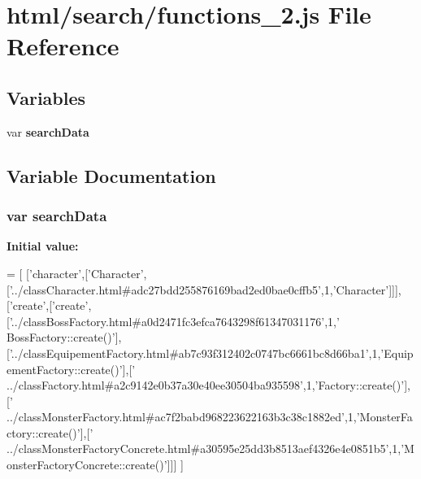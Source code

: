 \section{html/search/functions\-\_\-2.js File Reference}
\label{functions__2_8js}
\subsection*{Variables}
\begin{DoxyCompactItemize}
\item 
var {\bf search\-Data}
\end{DoxyCompactItemize}


\subsection{Variable Documentation}
\subsubsection[{search\-Data}]{\setlength{\rightskip}{0pt plus 5cm}var search\-Data}\label{functions__2_8js_ad01a7523f103d6242ef9b0451861231e}
{\bfseries Initial value\-:}
\begin{DoxyCode}
=
[
  [\textcolor{stringliteral}{'character'},[\textcolor{stringliteral}{'Character'},[\textcolor{stringliteral}{'../classCharacter.html#adc27bdd255876169bad2ed0bae0cffb5'},1,\textcolor{stringliteral}{'Character'}]]],
  [\textcolor{stringliteral}{'create'},[\textcolor{stringliteral}{'create'},[\textcolor{stringliteral}{'../classBossFactory.html#a0d2471fc3efca7643298f61347031176'},1,\textcolor{stringliteral}{'
      BossFactory::create()'}],[\textcolor{stringliteral}{'../classEquipementFactory.html#ab7c93f312402c0747bc6661bc8d66ba1'},1,\textcolor{stringliteral}{'EquipementFactory::create()'}],[\textcolor{stringliteral}{'
      ../classFactory.html#a2c9142e0b37a30e40ee30504ba935598'},1,\textcolor{stringliteral}{'Factory::create()'}],[\textcolor{stringliteral}{'
      ../classMonsterFactory.html#ac7f2babd968223622163b3c38c1882ed'},1,\textcolor{stringliteral}{'MonsterFactory::create()'}],[\textcolor{stringliteral}{'
      ../classMonsterFactoryConcrete.html#a30595e25dd3b8513aef4326e4e0851b5'},1,\textcolor{stringliteral}{'MonsterFactoryConcrete::create()'}]]]
]
\end{DoxyCode}
